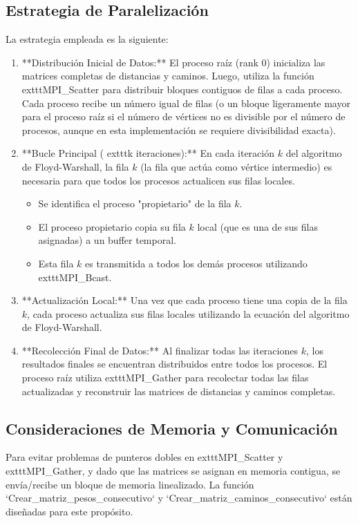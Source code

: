 \documentclass[12pt, a4paper]{article}
\begin{document}
\subsection{Estrategia de Paralelización}
La estrategia empleada es la siguiente:
\begin{enumerate}
    \item **Distribución Inicial de Datos:** El proceso raíz (rank 0) inicializa las matrices completas de distancias y caminos. Luego, utiliza la función 	exttt{MPI\_Scatter} para distribuir bloques contiguos de filas a cada proceso. Cada proceso recibe un número igual de filas (o un bloque ligeramente mayor para el proceso raíz si el número de vértices no es divisible por el número de procesos, aunque en esta implementación se requiere divisibilidad exacta).
    \item **Bucle Principal (	exttt{k} iteraciones):** En cada iteración $k$ del algoritmo de Floyd-Warshall, la fila $k$ (la fila que actúa como vértice intermedio) es necesaria para que todos los procesos actualicen sus filas locales.
    \begin{itemize}
        \item Se identifica el proceso "propietario" de la fila $k$.
        \item El proceso propietario copia su fila $k$ local (que es una de sus filas asignadas) a un buffer temporal.
        \item Esta fila $k$ es transmitida a todos los demás procesos utilizando 	exttt{MPI\_Bcast}.
    \end{itemize}
    \item **Actualización Local:** Una vez que cada proceso tiene una copia de la fila $k$, cada proceso actualiza sus filas locales utilizando la ecuación del algoritmo de Floyd-Warshall.
    \item **Recolección Final de Datos:** Al finalizar todas las iteraciones $k$, los resultados finales se encuentran distribuidos entre todos los procesos. El proceso raíz utiliza 	exttt{MPI\_Gather} para recolectar todas las filas actualizadas y reconstruir las matrices de distancias y caminos completas.
\end{enumerate}

\subsection{Consideraciones de Memoria y Comunicación}
Para evitar problemas de punteros dobles en 	exttt{MPI\_Scatter} y 	exttt{MPI\_Gather}, y dado que las matrices se asignan en memoria contigua, se envía/recibe un bloque de memoria linealizado. La función `Crear_matriz_pesos_consecutivo` y `Crear_matriz_caminos_consecutivo` están diseñadas para este propósito.
\end{document}
